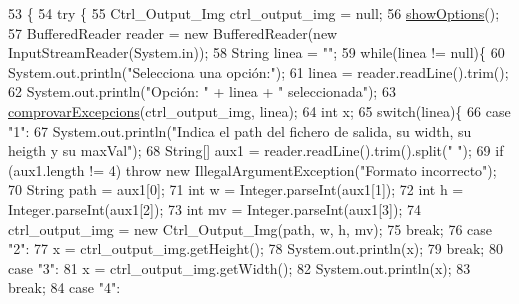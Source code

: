 \begin{DoxyCode}
53                                            \{
54     \textcolor{keywordflow}{try} \{
55         Ctrl\_Output\_Img ctrl\_output\_img = null;
56         \hyperlink{classpersistencia_1_1output_1_1Driver____Ctrl__Output__Img_a407a2c1e80b099b7cae5dd0a19683d09}{showOptions}();
57         BufferedReader reader = \textcolor{keyword}{new} BufferedReader(\textcolor{keyword}{new} InputStreamReader(System.in));
58         String linea = \textcolor{stringliteral}{""};
59         \textcolor{keywordflow}{while}(linea != null)\{
60             System.out.println(\textcolor{stringliteral}{"Selecciona una opción:"});
61             linea = reader.readLine().trim();
62             System.out.println(\textcolor{stringliteral}{"Opción: "} + linea + \textcolor{stringliteral}{" seleccionada"});
63             \hyperlink{classpersistencia_1_1output_1_1Driver____Ctrl__Output__Img_ab6af9c875a2582dbb7e466be9bb6bbbb}{comprovarExcepcions}(ctrl\_output\_img, linea);
64             \textcolor{keywordtype}{int} x;
65             \textcolor{keywordflow}{switch}(linea)\{
66                 \textcolor{keywordflow}{case} \textcolor{stringliteral}{"1"}:
67                     System.out.println(\textcolor{stringliteral}{"Indica el path del fichero de salida, su width, su heigth y su
       maxVal"});
68                     String[] aux1 = reader.readLine().trim().split(\textcolor{stringliteral}{" "});
69                     \textcolor{keywordflow}{if} (aux1.length != 4) \textcolor{keywordflow}{throw} \textcolor{keyword}{new} IllegalArgumentException(\textcolor{stringliteral}{"Formato incorrecto"});
70                     String path = aux1[0];
71                     \textcolor{keywordtype}{int} w = Integer.parseInt(aux1[1]);
72                     \textcolor{keywordtype}{int} h = Integer.parseInt(aux1[2]);
73                     \textcolor{keywordtype}{int} mv = Integer.parseInt(aux1[3]);
74                     ctrl\_output\_img = \textcolor{keyword}{new} Ctrl\_Output\_Img(path, w, h, mv);
75                 \textcolor{keywordflow}{break};
76                 \textcolor{keywordflow}{case} \textcolor{stringliteral}{"2"}:
77                     x = ctrl\_output\_img.getHeight();
78                     System.out.println(x);
79                 \textcolor{keywordflow}{break};
80                 \textcolor{keywordflow}{case} \textcolor{stringliteral}{"3"}:
81                     x = ctrl\_output\_img.getWidth();
82                     System.out.println(x);
83                 \textcolor{keywordflow}{break};
84                 \textcolor{keywordflow}{case} \textcolor{stringliteral}{"4"}:

\end{DoxyCode}
